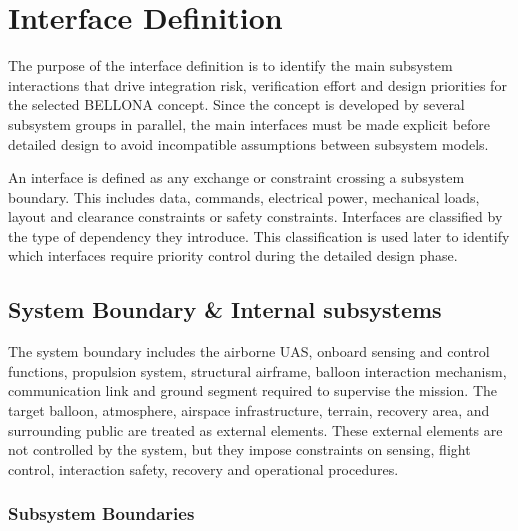 \chapter{Interface Definition}   
\label{Interfacedefinition}



The purpose of the interface definition is to identify the main subsystem interactions that drive integration risk, verification effort and design priorities for the selected BELLONA concept. Since the concept is developed by several subsystem groups in parallel, the main interfaces must be made explicit before detailed design to avoid incompatible assumptions between subsystem models. 

An interface is defined as any exchange or constraint crossing a subsystem boundary. This includes data, commands, electrical power, mechanical loads, layout and clearance constraints or safety constraints.
Interfaces are classified by the type of dependency they introduce. This classification is used later to identify which interfaces require priority control during the detailed design phase.




\section{System Boundary \& Internal subsystems}
The system boundary includes the airborne UAS, onboard sensing and control functions, propulsion system, structural airframe, balloon interaction mechanism, communication link and ground segment required to supervise the mission. The target balloon, atmosphere, airspace infrastructure, terrain, recovery area, and surrounding public are treated as external elements. These external elements are not controlled by the system, but they impose constraints on sensing, flight control, interaction safety, recovery and operational procedures.

\subsection{Subsystem Boundaries}









